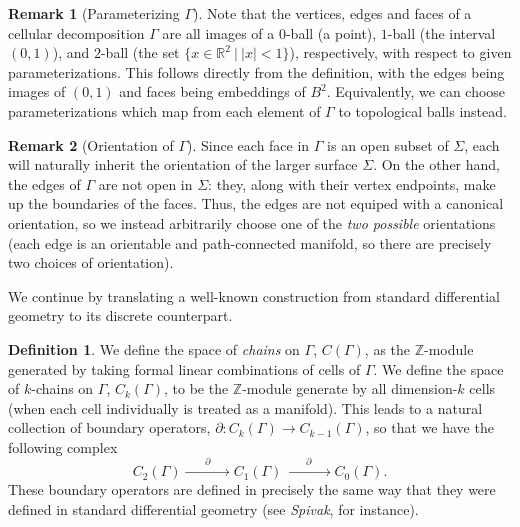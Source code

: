 \documentclass[aps,pra,showpacs,notitlepage,onecolumn,superscriptaddress,nofootinbib]{revtex4-1}
\theoremstyle{definition}
\newtheorem{definition}{Definition}[section]
\newtheorem{remark}{Remark}[section]
\begin{document}
\begin{remark}[Parameterizing $\Gamma$]
  Note that the vertices, edges and faces of a cellular decomposition $\Gamma$ are all images of a $0$-ball (a point), $1$-ball (the interval $(0, 1)$), and $2$-ball (the set $\{x \in \mathbb{R}^2 \ | \ |x| < 1\}$), respectively,
  with respect to given parameterizations. This follows directly from the definition, with the edges being images of $(0, 1)$ and faces being embeddings of $B^2$. Equivalently, we can choose parameterizations which map from each element
  of $\Gamma$ to topological balls instead.
\end{remark}

\begin{remark}[Orientation of $\Gamma$]
Since each face in $\Gamma$ is an open subset of $\Sigma$, each will naturally inherit the orientation of the larger surface $\Sigma$. On the other hand, the edges of $\Gamma$
are not open in $\Sigma$: they, along with their vertex endpoints, make up the boundaries of the faces. Thus, the edges are not equiped with a canonical orientation, so
we instead arbitrarily choose one of the \emph{two possible} orientations (each edge is an orientable and path-connected manifold, so there are precisely two choices of orientation).
\end{remark}

\noindent We continue by translating a well-known construction from standard differential geometry to its discrete counterpart.

\begin{definition}
  We define the space of \emph{chains} on $\Gamma$, $C(\Gamma)$, as the $\mathbb{Z}$-module generated by taking formal linear combinations of cells of $\Gamma$.
  We define the space of $k$-chains on $\Gamma$, $C_k(\Gamma)$, to be the $\mathbb{Z}$-module generate by all dimension-$k$ cells (when each cell individually is treated as a manifold).
  This leads to a natural collection of boundary operators, $\partial : C_k(\Gamma) \rightarrow C_{k - 1}(\Gamma)$, so that we have the following complex
  \begin{equation}
    C_2(\Gamma) \xrightarrow{\qquad \partial \qquad} C_1(\Gamma) \xrightarrow{\qquad \partial \qquad} C_0(\Gamma).
  \end{equation}
These boundary operators are defined in precisely the same way that they were defined in standard differential geometry (see \emph{Spivak}, for instance).
\end{definition}
\end{document}

